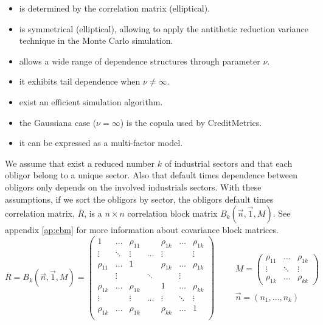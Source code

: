 \documentclass[11pt,fleqn]{book} %
\begin{document}
\begin{itemize}
	\item is determined by the correlation matrix (elliptical). 
	\item is symmetrical (elliptical), allowing to 
	apply the antithetic reduction variance technique in the Monte Carlo 
	simulation.
	\item allows a wide range of dependence structures through parameter $\nu$.
	\item it exhibits tail dependence when $\nu \ne \infty$.
	\item exist an efficient simulation algorithm.
	\item the Gaussiana case ($\nu = \infty$) is the copula used by 
	CreditMetrics\texttrademark.
	\item it can be expressed as a multi-factor model.
\end{itemize}

We assume that exist a reduced number $k$ of industrial sectors and that
each obligor belong to a unique sector. Also that default times dependence
between obligors only depends on the involved industrials sectors. With 
these assumptions, if we sort the obligors by sector, the obligors default 
times correlation matrix, $\bar{R}$, is a $n {\times} n$ correlation block 
matrix $B_k(\vec{n},\vec{1},M)$. See appendix \ref{ap:cbm} for more 
information about covariance block matrices. 
\begin{displaymath}
	\bar{R} = B_k(\vec{n},\vec{1},M) = 
	\left(
	\begin{array}{ccccccc}
		1         & \dots  & \rho_{11} &        & \rho_{1k} & \dots  & \rho_{1k} \\
		\vdots    & \ddots & \vdots    & \dots  & \vdots    &        & \vdots    \\
		\rho_{11} & \dots  & 1         &        & \rho_{1k} & \dots  & \rho_{1k} \\
		
		          & \vdots &           & \ddots &           & \vdots &           \\
		
		\rho_{1k} & \dots  & \rho_{1k} &        & 1         & \dots  & \rho_{kk} \\
		\vdots    &        & \vdots    & \dots  & \vdots    & \ddots & \vdots    \\
		\rho_{1k} & \dots  & \rho_{1k} &        & \rho_{kk} & \dots  & 1         \\
	\end{array}
	\right)
	\qquad 
	\begin{array}{l}
		M = 
		\left(
		\begin{array}{ccc}
		\rho_{11} & \dots  & \rho_{1k} \\
		\vdots    & \ddots & \vdots    \\
		\rho_{1k} & \dots  & \rho_{kk}
		\end{array}
		\right) \\
		\\
		\vec{n} = (n_1,\dots,n_k)
	\end{array}
\end{displaymath}
\end{document}

